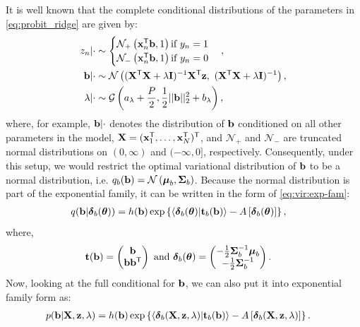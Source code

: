 \documentclass[]{article}
\newcommand{\Tra}{^{\sf T}} %
\newcommand{\Inv}{^{-1}} %
\newcommand{\V}[1]{{\bm{\mathbf{\MakeLowercase{#1}}}}} %
\newcommand{\M}[1]{{\bm{\mathbf{\MakeUppercase{#1}}}}} %
\def\b{{\bf b}}
\def\I{{\bf I}}
\def\t{{\bf t}}
\def\X{{\bf X}}
\def\x{{\bf x}}
\def\XtX{{\X\Tra \X}}
\def\z{{\bf z}}
\def \vmu{{\V{\mu}}}
\def \vdelta{{\V{\delta}}}
\def \msigma{{\M{\Sigma}}}
\def \vtheta{{\V{\theta}}}
\newcommand{\normal}{\mathcal{N}}
\begin{document}
It is well known that the complete conditional distributions of the parameters
in \eqref{eq:probit_ridge} are given by:
\begin{align*}
\begin{split}
z_n | \cdot & \sim \begin{cases}
\mathcal{N}_{+} \left(\x_n\Tra \b, 1 \right) \text{if } y_n = 1 \\
\mathcal{N}_{-} \left(\x_n\Tra \b, 1 \right) \text{if } y_n = 0 \\
\end{cases}, \\
\b | \cdot & \sim \mathcal{N} \left(
(\XtX + \lambda \I)\Inv \X\Tra \z, \ 
(\XtX + \lambda \I)\Inv
\right), \\
\lambda | \cdot & \sim \mathcal{G} \left(
a_{\lambda} + \frac{P}{2}, 
\frac{1}{2} ||\b||^2_2 + b_{\lambda}
\right), 
\end{split}
\end{align*}
where, for example, $\b | \cdot$ denotes the distribution of $\b$ conditioned on
all other parameters in the model, $\X = (\x_1\Tra, \dots, \x_N\Tra)\Tra$, and
$\normal_{+}$ and $\normal_{-}$ are truncated normal distributions on $(0,
\infty)$ and $(-\infty, 0]$, respectively. Consequently, under this setup, we
would restrict the optimal variational distribution of $\b$ to be a normal
distribution, i.e. $q_{b}(\b) = \mathcal{N} \left( \vmu_b, \msigma_b \right)$.
Because the normal distribution is part of the exponential family, it can be
written in the form of \eqref{eq:vir:exp-fam}: 
\begin{align}
q(\b | \vdelta_b(\vtheta)) & = h(\b) \exp \left \{ 
\langle \vdelta_b (\vtheta) |  \t_b(\b) \rangle
- A \left[ \vdelta_b (\vtheta) \right]
\right \},
\end{align}
where,
\begin{align}
\t(\b) & = \begin{pmatrix}
\b \\
\b \b\Tra
\end{pmatrix} \text{ and } \vdelta_b(\vtheta) = \begin{pmatrix}
-\frac{1}{2} \msigma_b\Inv \vmu_b \\
-\frac{1}{2} \msigma_b \Inv
\end{pmatrix}.
\end{align}
Now, looking at the full conditional for $\b$, we can also put it into
exponential family form as:
\begin{align}
p(\b | \X, \z, \lambda) & = h(\b) \exp \left\{
\langle \vdelta_b (\X, \z, \lambda) |  \t_b(\b) \rangle
- A \left[ \vdelta_b (\X, \z, \lambda) \right]
\right\}. 
\end{align}
\end{document}
